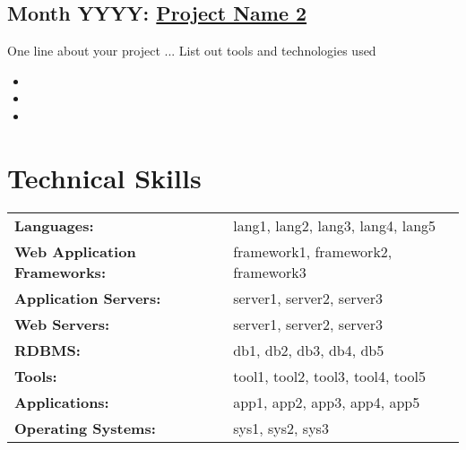 \documentclass[11pt, a4paper]{article}
\begin{document}
\subsection*{Month YYYY: {\href{http://project.website.com}{Project Name 2}}}
One line about your project ... List out tools and technologies used
\begin{itemize}\addtolength{\itemsep}{-0.5\baselineskip}
\item
\item
\item
\end{itemize}

\dotfill

\section*{Technical Skills}
\noindent
\begin{tabular}{ll}
\textbf{Languages:}&lang1, lang2, lang3, lang4, lang5\\
\textbf{Web Application Frameworks:}&framework1, framework2, framework3\\
\textbf{Application Servers:}&server1, server2, server3\\
\textbf{Web Servers:}&server1, server2, server3\\
\textbf{RDBMS:}&db1, db2, db3, db4, db5\\
\textbf{Tools:}&tool1, tool2, tool3, tool4, tool5\\
\textbf{Applications:}&app1, app2, app3, app4, app5\\
\textbf{Operating Systems:}&sys1, sys2, sys3\\
\end{tabular}\\

\dotfill
\end{document}
